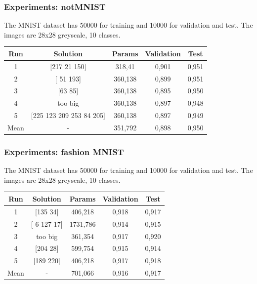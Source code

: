 \documentclass[aspectratio=169]{beamer}
\begin{document}
		\begin{frame}
			\frametitle{Experiments: notMNIST}
			
			The MNIST dataset has 50000 for training and 10000 for validation and test. The images are 28x28 greyscale, 10 classes.
			
			\begin{table}
				\begin{tabular}{c|c|c|c|c}
					\hline
					Run  &         Solution          & Params  & Validation & Test   \\ \hline
					 1   &       [217  21 150]       & 318,41  &   0,901    & 0,951  \\
					 2   &         [ 51 193]         & 360,138 &   0,899    & 0,951  \\
					 3   &          [63 85]          & 360,138 &   0,895    & 0,950  \\
					 4   &          too big          & 360,138 &   0,897    & 0,948  \\
					 5   & [225 123 209 253  84 205] & 360,138 &   0,897    & 0,949  \\
					Mean &             -             & 351,792 &   0,898    & 0,950  \\ \hline
				\end{tabular}
			\end{table}
		
		\end{frame}
		\begin{frame}
			\frametitle{Experiments: fashion MNIST}
			
			The MNIST dataset has 50000 for training and 10000 for validation and test. The images are 28x28 greyscale, 10 classes.
			
			\begin{table}
				\begin{tabular}{c|c|c|c|c}
					\hline
					Run  &   Solution    &  Params  & Validation & Test  \\ \hline
					 1   &   [135  34]   & 406,218  &   0,918    & 0,917 \\
					 2   & [  6 127  17] & 1731,786 &   0,914    & 0,915 \\
					 3   &    too big    & 361,354  &   0,917    & 0,920 \\
					 4   &   [204  28]   & 599,754  &   0,915    & 0,914 \\
					 5   &   [189 220]   & 406,218  &   0,917    & 0,918 \\
					Mean &       -       & 701,066  &   0,916    & 0,917 \\ \hline
				\end{tabular}
			\end{table}
		
		\end{frame}
\end{document}
